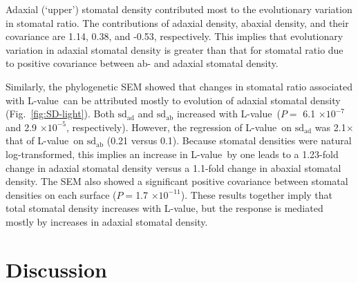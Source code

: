 \documentclass[12pt, oneside]{article}
\newcommand{\el}{L-value}
\begin{document}
Adaxial (`upper') stomatal density contributed most to the evolutionary variation in stomatal ratio. The contributions of adaxial density, abaxial density, and their covariance are 1.14, 0.38, and -0.53, respectively. This implies that evolutionary variation in adaxial stomatal density is greater than that for stomatal ratio due to positive covariance between ab- and adaxial stomatal density.

Similarly, the phylogenetic SEM showed that changes in stomatal ratio associated with \el~can be attributed mostly to evolution of adaxial stomatal density (Fig.~\ref{fig:SD-light}). Both $\mathrm{sd_{ad}}$ and $\mathrm{sd_{ab}}$ increased with \el~($P =$ 6.1 $\times10^{-7}$ and 2.9 $\times10^{-5}$, respectively). However, the regression of \el~on $\mathrm{sd_{ad}}$ was 2.1$\times$ that of \el~on $\mathrm{sd_{ab}}$ (0.21 versus 0.1). Because stomatal densities were natural log-transformed, this implies an increase in \el~by one leads to a 1.23-fold change in adaxial stomatal density versus a 1.1-fold change in abaxial stomatal density. The SEM also showed a significant positive covariance between stomatal densities on each surface ($P = $1.7 $\times10^{-11}$). These results together imply that total stomatal density increases with \el, but the response is mediated mostly by increases in adaxial stomatal density.



\section*{Discussion}
\end{document}
